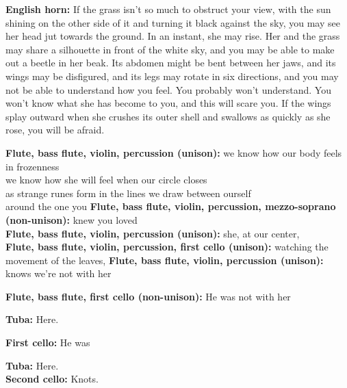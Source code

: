 \documentclass[11pt]{article}
\begin{document}
\begingroup
\textbf{English horn:} If the grass isn't so much to obstruct your view, with the sun shining on the other side of it and turning it black against the sky, you may see her head jut towards the ground. In an instant, she may rise. Her and the grass may share a silhouette in front of the white sky, and you may be able to make out a beetle in her beak. Its abdomen might be bent between her jaws, and its wings may be disfigured, and its legs may rotate in six directions, and you may not be able to understand how you feel. You probably won't understand. You won't know what she has become to you, and this will scare you. If the wings splay outward when she crushes its outer shell and swallows as quickly as she rose, you will be afraid.
\endgroup

\begingroup
\textbf{Flute, bass flute, violin, percussion (unison):} we know how our body feels in frozenness \\ we know how she will feel when our circle closes \\ as strange runes form in the lines we draw between ourself \\ around the one you \textbf{Flute, bass flute, violin, percussion, mezzo-soprano (non-unison):} knew you loved \\ \textbf{Flute, bass flute, violin, percussion (unison):} she, at our center, \\ \textbf{Flute, bass flute, violin, percussion, first cello (unison):} watching the movement of the leaves, \textbf{Flute, bass flute, violin, percussion (unison):} knows we're not with her
\endgroup

\begingroup
\textbf{Flute, bass flute, first cello (non-unison):} He was not with her
\endgroup

\begingroup
\textbf{Tuba:} Here.
\endgroup

\begingroup
\textbf{First cello:} He was
\endgroup

\begingroup
\textbf{Tuba:} Here. \\ \textbf{Second cello:} Knots.
\endgroup
\end{document}
